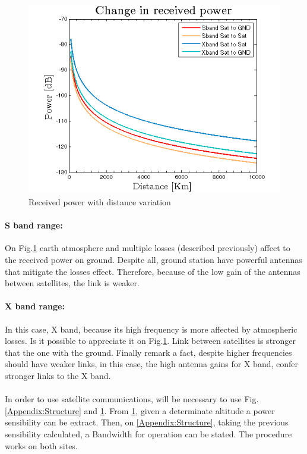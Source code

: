 \begin{figure}[h]
	\includegraphics[scale=0.9]{./sections/images/friisCases}
	\centering
	\caption{Received power with distance variation}
	\label{friis}
\end{figure}
\paragraph{S band range:} On Fig.\ref{friis} earth atmosphere and multiple losses (described previously) affect to the received power on ground. Despite all, ground station have powerful antennas that mitigate the losses effect. Therefore, because of the low gain of the antennas between satellites, the link is weaker.
\paragraph{X band range:} In this case, X band, because its high frequency is more affected by atmospheric losses. Is it possible to appreciate it on Fig.\ref{friis}. Link between satellites is stronger that the one with the ground. Finally remark a fact, despite higher frequencies should have weaker links, in this case, the high antenna gains for X band, confer stronger links to the X band.

\paragraph{}In order to use satellite communications, will be necessary to use Fig.\ref{Appendix:Structure} and \ref{friis}. From \ref{friis}, given a determinate altitude a power sensibility can be extract. Then, on \ref{Appendix:Structure}, taking the previous sensibility calculated, a Bandwidth for operation can be stated. The procedure works on both sites.
